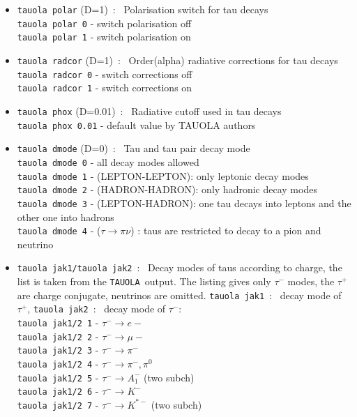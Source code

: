 \documentclass[a4paper,12pt]{article}
\newcommand{\tauola}{{\tt TAUOLA }}
\begin{document}
\begin{itemize}
\item{\tt  tauola polar} (D=1)\ : \ Polarisation switch for tau decays \\
{\tt tauola polar 0} - switch polarisation off \\
{\tt tauola polar 1} - switch polarisation on 
\item{\tt  tauola radcor} (D=1)\ : \ Order(alpha) radiative corrections for tau decays\\
{\tt tauola radcor 0} - switch corrections off\\
{\tt tauola radcor 1} - switch corrections on
\item{\tt  tauola phox} (D=0.01)\ : \ Radiative cutoff used in tau decays\\ 
{\tt tauola phox 0.01} - default value by TAUOLA authors
\item{\tt  tauola dmode} (D=0)\ : \ Tau and tau pair decay mode\\
{\tt tauola dmode 0} - all decay modes allowed\\
{\tt tauola dmode 1} - (LEPTON-LEPTON): only leptonic  decay modes\\
{\tt tauola dmode 2} - (HADRON-HADRON): only hadronic  decay modes\\
{\tt tauola dmode 3} - (LEPTON-HADRON): one tau decays into leptons and the other one into hadrons\\
{\tt tauola dmode 4} - ($\tau \to \pi \nu$)  : taus are restricted to decay to a pion and neutrino
\item{\tt  tauola jak1/tauola jak2}\ : \ Decay modes of taus according to charge, the list is
taken from the \tauola output. The listing gives only $\tau^-$ modes, the
$\tau^+$ are charge conjugate, neutrinos are omitted. {\tt tauola jak1}\ : \  decay
mode of $\tau^+$, {\tt tauola jak2}\ : \  decay mode of $\tau^-$:\\
{\tt tauola jak1/2  1}   - $\tau^-  \to  e- $\\
{\tt tauola jak1/2  2}   - $\tau^-  \to  \mu-$  \\
{\tt tauola jak1/2  3}   - $\tau^-  \to  \pi^-$ \\
{\tt tauola jak1/2  4}   - $\tau^-  \to  \pi^-, \pi^0 $\\
{\tt tauola jak1/2  5}   - $\tau^-  \to  A_1^-$ (two subch)\\
{\tt tauola jak1/2  6}   - $\tau^-  \to  K^- $\\
{\tt tauola jak1/2  7}   - $\tau^-  \to  K^{*-}$ (two subch)\\

\end{itemize}
\end{document}
